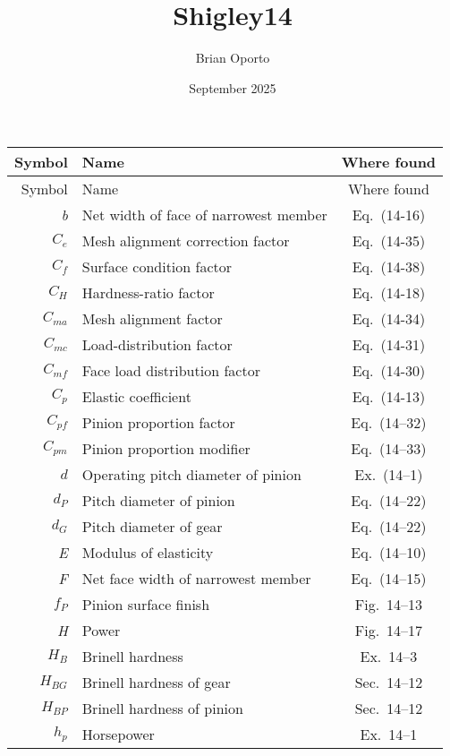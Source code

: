 \documentclass{article}
\title{Shigley14}
\author{Brian Oporto}
\date{September 2025}
\begin{document}
\begin{center}
\begin{longtable}{| r | l | c |}
\hline
Symbol & Name & Where found \\ \hline
\hline \hline
\endfirsthead

\hline
Symbol & Name & Where found \\ \hline
\hline \hline
\endhead

\textit{b} & Net width of face of narrowest member & Eq.~(14-16) \\
\hline
\textit{$C_e$} & Mesh alignment correction factor & Eq.~(14-35) \\
\hline
\textit{$C_f$} & Surface condition factor & Eq.~(14-38) \\
\hline
\textit{$C_H$} & Hardness-ratio factor & Eq.~(14-18) \\ 
\hline
\textit{$C_{ma}$} & Mesh alignment factor & Eq.~(14-34) \\ 
\hline
\textit{$C_{mc}$} & Load-distribution factor & Eq.~(14-31) \\
\hline
\textit{$C_{mf}$} & Face load distribution factor & Eq.~(14-30) \\
\hline
\textit{$C_p$} & Elastic coefficient & Eq.~(14-13) \\
\hline
\textit{$C_{pf}$} & Pinion proportion factor & Eq.~(14–32) \\
\hline
\textit{$C_{pm}$} & Pinion proportion modifier & Eq.~(14–33) \\
\hline
\textit{$d$} & Operating pitch diameter of pinion & Ex.~(14–1) \\
\hline
\textit{$d_P$} & Pitch diameter of pinion & Eq.~(14–22) \\
\hline
\textit{$d_G$} & Pitch diameter of gear & Eq.~(14–22) \\
\hline
\textit{E} & Modulus of elasticity & Eq.~(14–10) \\
\hline
\textit{F} & Net face width of narrowest member & Eq.~(14–15) \\
\hline
\textit{$f_P$} & Pinion surface finish & Fig.~14–13 \\
\hline
\textit{H} & Power & Fig.~14–17 \\
\hline
\textit{$H_B$} & Brinell hardness & Ex.~14–3 \\
\hline
\textit{$H_{BG}$} & Brinell hardness of gear  & Sec.~14–12 \\
\hline
\textit{$H_{BP}$} & Brinell hardness of pinion & Sec.~14–12 \\
\hline
\textit{$h_p$} & Horsepower & Ex.~14–1 \\

\end{longtable}
\end{center}
\end{document}
